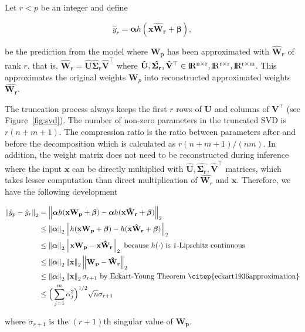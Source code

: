 \documentclass{article}
\def\x{\mathbf x}
\def\t{^\top}
\def \real{\rm I\!R}
\newcommand{\norm}[1]{\left\lVert#1\right\rVert}
\begin{document}
Let $r < p$ be an integer and define 

$$\hat y_r = \boldsymbol{\alpha} h(\x \mathbf{\hat W_r} + \boldsymbol{\beta}),$$

be the prediction from the model where $\mathbf{W_p}$ has been approximated with $\mathbf{\hat W_r}$ of rank $r$, that is, $\mathbf{\hat W_r} = \mathbf{\hat U \hat \Sigma_r \hat V^{\top}}$ where $\mathbf{\hat{U}, \hat{\Sigma_r}, \hat{V}\t} \in \real^{n\times r}, \real^{r\times r}, \real^{r \times m}$. This approximates the original weights $\mathbf W_p$ into reconstructed approximated weights $\mathbf{\hat{W_r}}$. 

The truncation process always keeps the first $r$ rows of $\mathbf U$ and columns of $\mathbf V\t$  (see Figure~\ref{fig:svd}). The number of non-zero parameters in the truncated SVD is $r( n + m + 1)$. The compression ratio is the ratio between parameters after and before the decomposition which is calculated as $r( n + m + 1)/( nm )$. In addition, the weight matrix does not need to be reconstructed during inference where the input $\x$ can be directly multiplied with $\mathbf{\hat{U}, \hat{\Sigma_r}, \hat{V}\t}$ matrices, which takes lesser computation than direct multiplication of $\hat{\mathbf W_r}$ and $\x$. Therefore, we have the following development

\begin{align*}
\norm{ \hat y_p - \hat y_r }_2 &= \norm{\boldsymbol{\alpha} h(\x \mathbf{W_p} + \boldsymbol{\beta}) - \boldsymbol{\alpha} h(\x \mathbf{\hat W_r} + \boldsymbol{\beta})}_2  \\
&\leq \norm{\boldsymbol{\alpha}}_2 \norm{h(\x \mathbf{W_p} + \boldsymbol{\beta}) - h(\x \mathbf{\hat W_r} + \boldsymbol{\beta})}_2\\
&\leq \norm{\boldsymbol{\alpha}}_2 \norm{\x \mathbf{W_p} - \x \mathbf{\hat W_r}}_2 ~ \text{because $h(\cdot)$ is $1$-Lipschitz continuous}\\
&\leq \norm{\boldsymbol{\alpha}}_2 \norm{\x}_2 \norm{\mathbf{W_p} - \mathbf{\hat W_r}}_2\\
&\leq \norm{\boldsymbol{\alpha}}_2 \norm{\x}_2 \sigma_{r+1} ~ \text{by Eckart-Young Theorem \citep{eckart1936approximation}}\\
&\leq \Big( \sum_{j=1}^m \alpha_j ^ 2 \Big)^{1/2}  \sqrt{n} \sigma_{r+1}
\end{align*}

where $\sigma_{r+1}$ is the $(r+1)$th singular value of $\mathbf{W_p}$.
\end{document}
